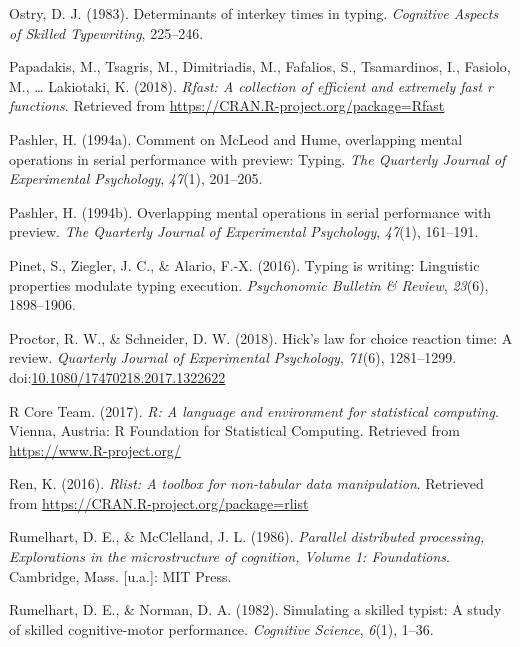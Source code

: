 \documentclass[floatsintext,man]{apa6}
\theoremstyle{definition}
\theoremstyle{definition}
\theoremstyle{definition}
\theoremstyle{remark}
\begin{document}
\hypertarget{ref-OstryDeterminantsinterkeytimes1983}{}
Ostry, D. J. (1983). Determinants of interkey times in typing.
\emph{Cognitive Aspects of Skilled Typewriting}, 225--246.

\hypertarget{ref-R-Rfast}{}
Papadakis, M., Tsagris, M., Dimitriadis, M., Fafalios, S., Tsamardinos,
I., Fasiolo, M., \ldots{} Lakiotaki, K. (2018). \emph{Rfast: A
collection of efficient and extremely fast r functions}. Retrieved from
\url{https://CRAN.R-project.org/package=Rfast}

\hypertarget{ref-pashler_comment_1994}{}
Pashler, H. (1994a). Comment on McLeod and Hume, overlapping mental
operations in serial performance with preview: Typing. \emph{The
Quarterly Journal of Experimental Psychology}, \emph{47}(1), 201--205.

\hypertarget{ref-pashler_overlapping_1994}{}
Pashler, H. (1994b). Overlapping mental operations in serial performance
with preview. \emph{The Quarterly Journal of Experimental Psychology},
\emph{47}(1), 161--191.

\hypertarget{ref-PinetTypingwritingLinguistic2016}{}
Pinet, S., Ziegler, J. C., \& Alario, F.-X. (2016). Typing is writing:
Linguistic properties modulate typing execution. \emph{Psychonomic
Bulletin \& Review}, \emph{23}(6), 1898--1906.

\hypertarget{ref-proctor_hicks_2018}{}
Proctor, R. W., \& Schneider, D. W. (2018). Hick's law for choice
reaction time: A review. \emph{Quarterly Journal of Experimental
Psychology}, \emph{71}(6), 1281--1299.
doi:\href{https://doi.org/10.1080/17470218.2017.1322622}{10.1080/17470218.2017.1322622}

\hypertarget{ref-R-base}{}
R Core Team. (2017). \emph{R: A language and environment for statistical
computing}. Vienna, Austria: R Foundation for Statistical Computing.
Retrieved from \url{https://www.R-project.org/}

\hypertarget{ref-R-rlist}{}
Ren, K. (2016). \emph{Rlist: A toolbox for non-tabular data
manipulation}. Retrieved from
\url{https://CRAN.R-project.org/package=rlist}

\hypertarget{ref-rumelhart_parallel_1986}{}
Rumelhart, D. E., \& McClelland, J. L. (1986). \emph{Parallel
distributed processing, Explorations in the microstructure of cognition,
Volume 1: Foundations}. Cambridge, Mass. {[}u.a.{]}: MIT Press.

\hypertarget{ref-RumelhartSimulatingskilledtypist1982}{}
Rumelhart, D. E., \& Norman, D. A. (1982). Simulating a skilled typist:
A study of skilled cognitive-motor performance. \emph{Cognitive
Science}, \emph{6}(1), 1--36.
\end{document}
